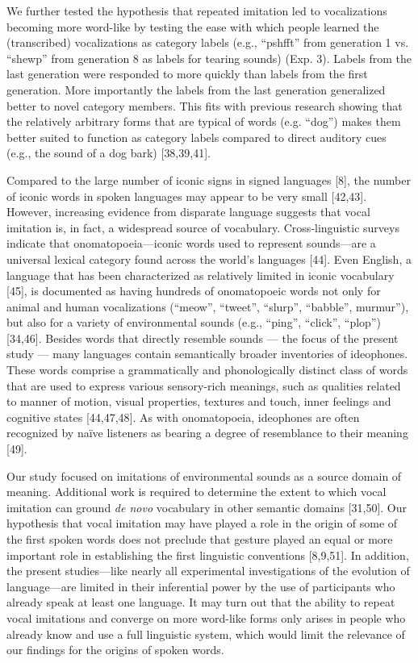 \documentclass[english,floatsintext,man]{apa6}
\theoremstyle{definition}
\theoremstyle{definition}
\theoremstyle{definition}
\theoremstyle{remark}
\begin{document}
We further tested the hypothesis that repeated imitation led to
vocalizations becoming more word-like by testing the ease with which
people learned the (transcribed) vocalizations as category labels (e.g.,
\enquote{pshfft} from generation 1 vs. \enquote{shewp} from generation 8
as labels for tearing sounds) (Exp. 3). Labels from the last generation
were responded to more quickly than labels from the first generation.
More importantly the labels from the last generation generalized better
to novel category members. This fits with previous research showing that
the relatively arbitrary forms that are typical of words (e.g.
\enquote{dog}) makes them better suited to function as category labels
compared to direct auditory cues (e.g., the sound of a dog bark)
{[}38,39,41{]}.

Compared to the large number of iconic signs in signed languages
{[}8{]}, the number of iconic words in spoken languages may appear to be
very small {[}42,43{]}. However, increasing evidence from disparate
language suggests that vocal imitation is, in fact, a widespread source
of vocabulary. Cross-linguistic surveys indicate that
onomatopoeia---iconic words used to represent sounds---are a universal
lexical category found across the world's languages {[}44{]}. Even
English, a language that has been characterized as relatively limited in
iconic vocabulary {[}45{]}, is documented as having hundreds of
onomatopoeic words not only for animal and human vocalizations
(\enquote{meow}, \enquote{tweet}, \enquote{slurp}, \enquote{babble},
murmur''), but also for a variety of environmental sounds (e.g.,
\enquote{ping}, \enquote{click}, \enquote{plop}) {[}34,46{]}. Besides
words that directly resemble sounds --- the focus of the present study
--- many languages contain semantically broader inventories of
ideophones. These words comprise a grammatically and phonologically
distinct class of words that are used to express various sensory-rich
meanings, such as qualities related to manner of motion, visual
properties, textures and touch, inner feelings and cognitive states
{[}44,47,48{]}. As with onomatopoeia, ideophones are often recognized by
naïve listeners as bearing a degree of resemblance to their meaning
{[}49{]}.

Our study focused on imitations of environmental sounds as a source
domain of meaning. Additional work is required to determine the extent
to which vocal imitation can ground \emph{de novo} vocabulary in other
semantic domains {[}31,50{]}. Our hypothesis that vocal imitation may
have played a role in the origin of some of the first spoken words does
not preclude that gesture played an equal or more important role in
establishing the first linguistic conventions {[}8,9,51{]}. In addition,
the present studies---like nearly all experimental investigations of the
evolution of language---are limited in their inferential power by the
use of participants who already speak at least one language. It may turn
out that the ability to repeat vocal imitations and converge on more
word-like forms only arises in people who already know and use a full
linguistic system, which would limit the relevance of our findings for
the origins of spoken words.
\end{document}
